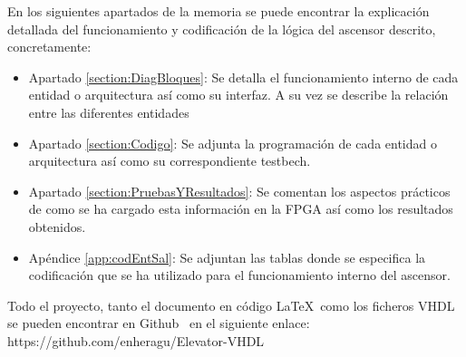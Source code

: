     En los siguientes apartados de la memoria se puede encontrar la explicación detallada del funcionamiento y codificación de la lógica del ascensor descrito, concretamente:
    \begin{itemize}
        \item Apartado \ref{section:DiagBloques}: Se detalla el funcionamiento interno de cada entidad o arquitectura así como su interfaz. A su vez se describe la relación entre las diferentes entidades
        \item Apartado \ref{section:Codigo}: Se adjunta la programación de cada entidad o arquitectura así como su correspondiente testbech.
        \item Apartado \ref{section:PruebasYResultados}: Se comentan los aspectos prácticos de como se ha cargado esta información en la FPGA así como los resultados obtenidos.
        \item Apéndice \ref{app:codEntSal}: Se adjuntan las tablas donde se especifica la codificación que se ha utilizado para el funcionamiento interno del ascensor.
    \end{itemize}
    
    Todo el proyecto, tanto el documento en código \LaTeX\  como los ficheros VHDL se pueden encontrar en Github \faGithub\ en el siguiente enlace: https://github.com/enheragu/Elevator-VHDL
